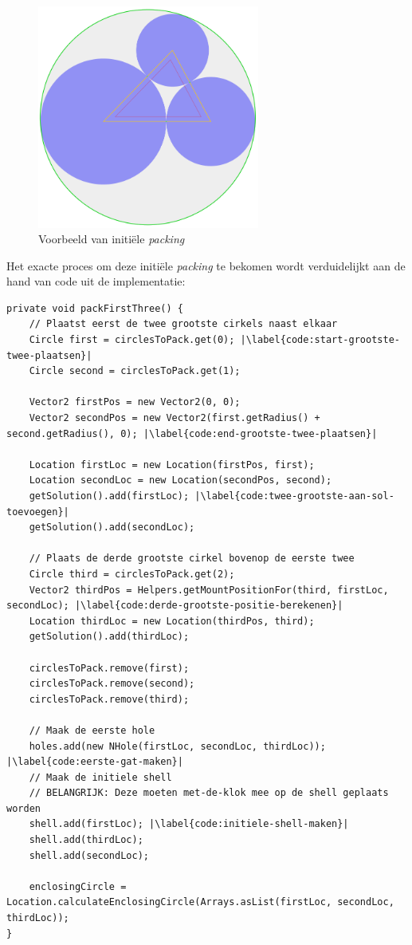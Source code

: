 \documentclass[12pt,a4paper,oneside]{book}
\begin{document}
\begin{figure}
  \centering
  \includegraphics[width=0.65\textwidth]{initialisatie.png}
  \caption{Voorbeeld van initiële \textit{packing}} \label{fig:initialisatie} 
\end{figure}

Het exacte proces om deze initiële \textit{packing} te bekomen wordt verduidelijkt aan de hand van code uit de implementatie:

\begin{lstlisting}
private void packFirstThree() {
	// Plaatst eerst de twee grootste cirkels naast elkaar
	Circle first = circlesToPack.get(0); |\label{code:start-grootste-twee-plaatsen}|
	Circle second = circlesToPack.get(1);

	Vector2 firstPos = new Vector2(0, 0);
	Vector2 secondPos = new Vector2(first.getRadius() + second.getRadius(), 0); |\label{code:end-grootste-twee-plaatsen}|

	Location firstLoc = new Location(firstPos, first);
	Location secondLoc = new Location(secondPos, second);
	getSolution().add(firstLoc); |\label{code:twee-grootste-aan-sol-toevoegen}|
	getSolution().add(secondLoc);
	
	// Plaats de derde grootste cirkel bovenop de eerste twee
	Circle third = circlesToPack.get(2);
	Vector2 thirdPos = Helpers.getMountPositionFor(third, firstLoc, secondLoc); |\label{code:derde-grootste-positie-berekenen}|
	Location thirdLoc = new Location(thirdPos, third);
	getSolution().add(thirdLoc);

	circlesToPack.remove(first);
	circlesToPack.remove(second);
	circlesToPack.remove(third);
	
	// Maak de eerste hole
	holes.add(new NHole(firstLoc, secondLoc, thirdLoc)); |\label{code:eerste-gat-maken}|
	// Maak de initiele shell
	// BELANGRIJK: Deze moeten met-de-klok mee op de shell geplaats worden
	shell.add(firstLoc); |\label{code:initiele-shell-maken}|
	shell.add(thirdLoc);
	shell.add(secondLoc);

	enclosingCircle = Location.calculateEnclosingCircle(Arrays.asList(firstLoc, secondLoc, thirdLoc));
}
\end{lstlisting}
\end{document}

